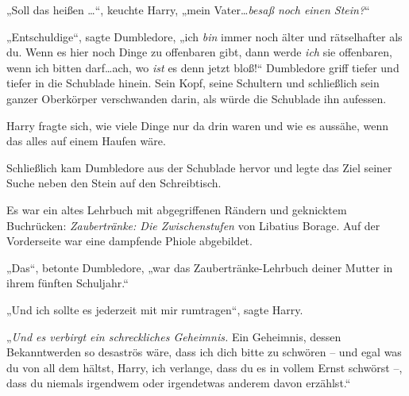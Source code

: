„Soll das heißen …“, keuchte Harry, „mein Vater…\emph{besaß noch einen Stein?}“

„Entschuldige“, sagte Dumbledore, „ich \emph{bin} immer noch älter und rätselhafter als du. Wenn es hier noch Dinge zu offenbaren gibt, dann werde \emph{ich} sie offenbaren, wenn ich bitten darf…ach, wo \emph{ist} es denn jetzt bloß!“ Dumbledore griff tiefer und tiefer in die Schublade hinein. Sein Kopf, seine Schultern und schließlich sein ganzer Oberkörper verschwanden darin, als würde die Schublade ihn aufessen.

Harry fragte sich, wie viele Dinge nur da drin waren und wie es aussähe, wenn das alles auf einem Haufen wäre.

Schließlich kam Dumbledore aus der Schublade hervor und legte das Ziel seiner Suche neben den Stein auf den Schreibtisch.

Es war ein altes Lehrbuch mit abgegriffenen Rändern und geknicktem Buchrücken: \emph{Zaubertränke: Die Zwischenstufen} von Libatius Borage. Auf der Vorderseite war eine dampfende Phiole abgebildet.

„Das“, betonte Dumbledore, „war das Zaubertränke-Lehrbuch deiner Mutter in ihrem fünften Schuljahr.“

„Und ich sollte es jederzeit mit mir rumtragen“, sagte Harry.

„\emph{Und es verbirgt ein schreckliches Geheimnis.} Ein Geheimnis, dessen Bekanntwerden so desaströs wäre, dass ich dich bitte zu schwören – und egal was du von all dem hältst, Harry, ich verlange, dass du es in vollem Ernst schwörst –, dass du niemals irgendwem oder irgendetwas anderem davon erzählst.“

